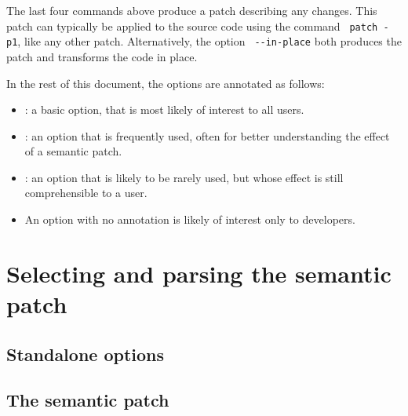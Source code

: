 The last four commands above produce a patch describing any changes.  This
patch can typically be applied to the source code using the command {\tt
  patch -p1}, like any other patch.  Alternatively, the option {\tt
  -{}-in-place} both produces the patch and transforms the code in place.

In the rest of this document, the options are annotated as follows:
\begin{itemize}
\item \FilledBigDiamondshape: a basic option, that is most likely of
  interest to all users.
\item \BigLowerDiamond: an option that is frequently used, often for better
understanding the effect of a semantic patch.
\item \BigDiamondshape: an option that is likely to be rarely used, but
  whose effect is still comprehensible to a user.
\item An option with no annotation is likely of interest only to
  developers.
\end{itemize}

\section{Selecting and parsing the semantic patch}

\subsection{Standalone options}



\subsection{The semantic patch}


